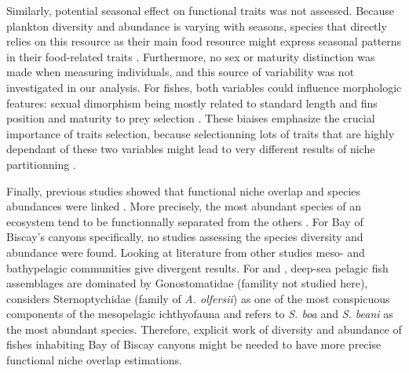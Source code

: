 Similarly, potential seasonal effect on functional traits was not assessed. Because plankton diversity and abundance is varying with seasons, species that directly relies on this resource as their main food resource might express seasonal patterns in their food-related traits \citep{kremer2017}. Furthermore, no sex or maturity distinction was made when measuring individuals, and this source of variability was not investigated in our analysis. For fishes, both variables could influence morphologic features: sexual dimorphism being mostly related to standard length and fins position and maturity to prey selection \citep{geidner2008,nagelkerke2018}. These biaises emphasize the crucial importance of traits selection, because selectionning lots of traits that are highly dependant of these two variables might lead to very different results of niche partitionning \citep{dasilva2019,dumay2004,nagelkerke2018}.

Finally, previous studies showed that functional niche overlap and species abundances were linked \citep{aneeshkumar2017,mason2008}. More precisely, the most abundant species of an ecosystem tend to be functionnally separated from the others \citep{farre2016}. For Bay of Biscay's canyons specifically, no studies assessing the species diversity and abundance were found. Looking at literature from other studies meso- and bathypelagic communities give divergent results. For \citet{garcia2021} and \cite{kenchington2020}, deep-sea pelagic fish assemblages are dominated by Gonostomatidae (famility not studied here), \citet{eduardo2020} considers Sternoptychidae (family of \textit{A. olfersii}) as one of the most conspicuous components of the mesopelagic ichthyofauna and \citep{sutton2008} refers to \textit{S. boa} and \textit{S. beani} as the most abundant species. Therefore, explicit work of diversity and abundance of fishes inhabiting Bay of Biscay canyons might be needed to have more precise functional niche overlap estimations.\\



